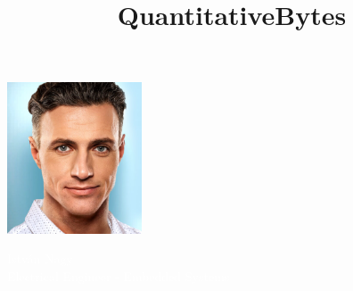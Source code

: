 \documentclass[11pt,oneslide,a4paper,titlepage]{article}
\title{QuantitativeBytes}
\date{}
\begin{document}

\begin{tcolorbox}
	\begin{minipage}{4.5cm}
		\hspace*{-0.3cm}\includegraphics[width=4cm]{pictures/face.jpg}
	\end{minipage}
	\begin{minipage}{15cm}
		\begin{center}
			\Huge{\textcolor{white}{István Nagy}} \\
			\vspace*{0.5cm}
			\Large{\textcolor{white}{{Electrical Engineer - Embedded Systems}}}
		\end{center}
	\end{minipage}
\end{tcolorbox}
\end{document}
